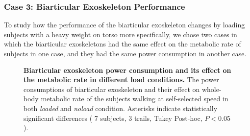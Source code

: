 \documentclass[10pt,letterpaper]{article}
\begin{document}
\subsubsection*{Case 3: Biarticular Exoskeleton Performance}
To study how the performance of the biarticular exoskeleton changes by loading subjects with a heavy weight on torso more specifically, we chose two cases in which the biarticular exoskeletons had the same effect on the metabolic rate of subjects in one case, and they had the same power consumption in another case.\\ 
\begin{figure}[th!]
	\centering
	\hfil
	\vspace{2mm}
	\caption{\small{\textbf{Biarticular exoskeleton power consumption and its effect on the metabolic rate in different load conditions.} The power consumptions of biarticular exoskeleton and their effect on whole-body metabolic rate of the subjects walking at self-selected speed in both {\it loaded} and {\it noload} condition. Asterisks indicate statistically significant differences ( 7 subjects, 3 trails, Tukey Post-hoc, $P < 0.05$).}}
	\label{Fig_Case03_Energy_Plot}
\end{figure}
\end{document}
